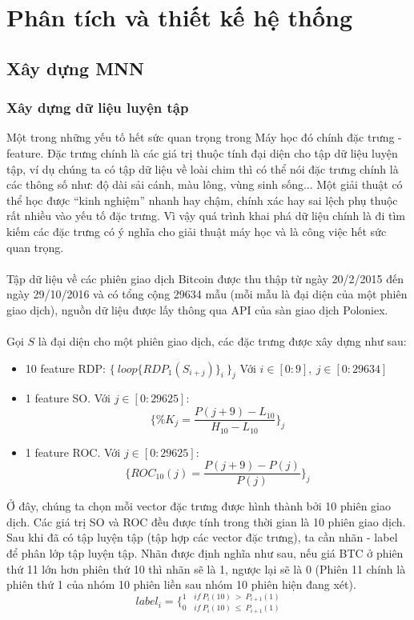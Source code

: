 \chapter{Phân tích và thiết kế hệ thống}
\section{Xây dựng MNN}
\subsection{Xây dựng dữ liệu luyện tập}
Một trong những yếu tố hết sức quan trọng trong Máy học đó chính đặc trưng 
- feature. Đặc trưng chính là các giá trị thuộc tính đại diện cho tập dữ liệu 
luyện tập, ví dụ chúng ta có tập dữ liệu về loài chim thì có thể nói đặc trưng 
chính là các thông số như: độ dài sải cánh, màu lông, vùng sinh sống... Một 
giải thuật có thể học được ``kinh nghiệm'' nhanh hay chậm, chính xác hay sai lệch 
phụ thuộc rất nhiều vào yếu tố đặc trưng. Vì vậy quá trình khai phá dữ liệu 
chính là đi tìm kiếm các đặc trưng có ý nghĩa cho giải thuật máy học và là 
công việc hết sức quan trọng.\\\\
Tập dữ liệu về các phiên giao dịch Bitcoin được thu thập từ ngày 20/2/2015 đến 
ngày 29/10/2016 và có tổng cộng 29634 mẫu (mỗi mẫu là đại diện của một phiên 
giao dịch), nguồn dữ liệu được lấy thông qua API của sàn giao dịch Poloniex.\\\\
Gọi $S$ là đại diện cho một phiên giao dịch, các đặc trưng được xây dựng như 
sau:
\begin{itemize}
    \item 10 feature RDP: $\{ \: loop\{ RDP_1(S_{i+j})\}_i \: \}_j$ Với 
    $i \in [0:9], \: j \in [0:29634]$
    \item 1 feature SO. Với $ j \in [0:29625] $:\\
    \[
        \{ \%K_j = \frac{P(j+9)-L_{10}}{H_{10}-L_{10}} \}_j
    \]
    \item 1 feature ROC. Với $ j \in [0:29625] $:\\ 
    \[
        \{ ROC_{10}(j)= \frac{P(j+9) - P(j)}{P(j)} \}_j
    \]
\end{itemize}
Ở đây, chúng ta chọn mỗi vector đặc trưng được hình thành bởi 10 phiên giao 
dịch. Các giá trị SO và ROC đều được tính trong thời gian là 10 phiên giao dịch.
Sau khi đã có tập luyện tập (tập hợp các vector đặc trưng), ta cần nhãn - label 
để phân lớp tập luyện tập. Nhãn được định nghĩa như sau, nếu giá BTC ở phiên 
thứ 11 lớn hơn phiên thứ 10 thì nhãn sẽ là 1, ngược lại sẽ là 0 (Phiên 11 chính 
là phiên thứ 1 của nhóm 10 phiên liền sau nhóm 10 phiên hiện đang xét).\\
\[
    label_i = \bigg \{ _{0 \quad if \: P_i(10) \: \leq \: P_{i+1}(1)} ^{1 \quad if \: P_i(10) \: > \: P_{i+1}(1)}
\]
